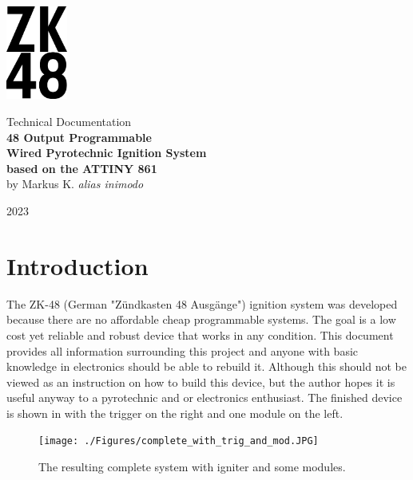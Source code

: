 


\begin{titlepage}
\begin{center}
\vspace*{1cm}
\includegraphics[width=2cm]{./Figures/zk_48_logo.png}
\vspace*{1cm}

\Huge {Technical Documentation\\} 
\vspace*{1cm}
\Huge{\textbf{48 Output Programmable\\ Wired Pyrotechnic Ignition System\\ based on the ATTINY 861\\}}
\vspace*{0.5cm} 
\Large{by Markus K. \textit{alias inimodo}}
\vspace*{0.5cm}

\Large{2023}
\end{center}
\end{titlepage}

\pagebreak 

\tableofcontents

\pagebreak

\section{Introduction}
The ZK-48 (German "Zündkasten 48 Ausgänge") ignition system was developed because there are no affordable cheap programmable systems. The goal is a low cost yet reliable and robust device that works in any condition. This document provides all information surrounding this project and anyone with basic knowledge in electronics should be able to rebuild it. Although this should not be viewed as an instruction on how to build this device, but the author hopes it is useful anyway to a pyrotechnic and or electronics enthusiast. The finished device is shown in  with the trigger on the right and one module on the left.

\begin{figure}[!ht]
    \centering
    \texttt{[image: ./Figures/complete\_with\_trig\_and\_mod.JPG]}
    \caption{The resulting complete system with igniter and some modules.}
    \label{fig:complete_with_trig_and_mod}     
\end{figure}

